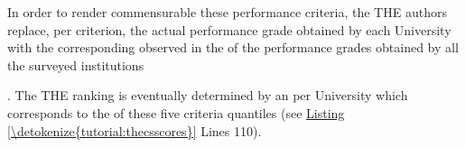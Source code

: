 \documentclass[a4paper,12pt,english]{sphinxhowto}
\begin{document}
In order to render commensurable these performance criteria, the THE authors replace, per criterion, the actual performance grade obtained by each University with the corresponding  observed in the  of the performance grades obtained by all the surveyed institutions %
\begin{footnote}[40]\sphinxAtStartFootnote
{}
%
\end{footnote}. The THE ranking is eventually determined by an  per University which corresponds to the  of these five criteria quantiles (see \hyperref[\detokenize{tutorial:thecsscores}]{Listing \ref{\detokenize{tutorial:thecsscores}}} Lines 1\sphinxhyphen{}10).
\def\sphinxLiteralBlockLabel{\label{\detokenize{tutorial:thecsscores}}}
\end{document}

